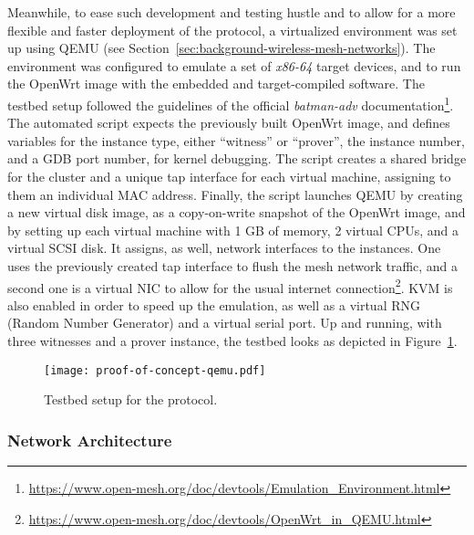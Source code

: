 Meanwhile, to ease such development and testing hustle and to allow for a more flexible and faster deployment of the protocol, a virtualized environment was set up using QEMU (see Section~\ref{sec:background-wireless-mesh-networks}). The environment was configured to emulate a set of \emph{x86-64} target devices, and to run the OpenWrt image with the embedded and target-compiled \pol{} software. The testbed setup followed the guidelines of the official \emph{batman-adv} documentation\footnote{\url{https://www.open-mesh.org/doc/devtools/Emulation_Environment.html}}. The automated script expects the previously built OpenWrt image, and defines variables for the instance type, either “witness” or “prover”, the instance number, and a GDB port number, for kernel debugging. The script creates a shared bridge for the cluster and a unique tap interface for each virtual machine, assigning to them an individual MAC address. Finally, the script launches QEMU by creating a new virtual disk image, as a copy-on-write snapshot of the OpenWrt image, and by setting up each virtual machine with 1 GB of memory, 2 virtual CPUs, and a virtual SCSI disk. It assigns, as well, network interfaces to the instances. One uses the previously created tap interface to flush the mesh network traffic, and a second one is a virtual NIC to allow for the usual internet connection\footnote{\url{https://www.open-mesh.org/doc/devtools/OpenWrt_in_QEMU.html}}. KVM is also enabled in order to speed up the emulation, as well as a virtual RNG (Random Number Generator) and a virtual serial port. Up and running, with three witnesses and a prover instance, the testbed looks as depicted in Figure~\ref{fig:infrastructure:testbed}.

\begin{figure}[h!]
    \begin{center}
    \texttt{[image: proof-of-concept-qemu.pdf]}
    \caption{Testbed setup for the \pol{} protocol.}
    \label{fig:infrastructure:testbed}
    \end{center}
\end{figure}

\subsubsection{Network Architecture} \label{sec:infrastructure:network-architecture}


